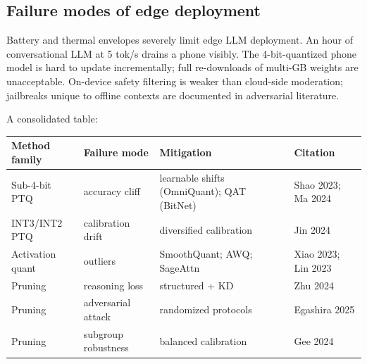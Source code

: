 \subsection{Failure modes of edge deployment}\label{failure-modes-of-edge-deployment}

Battery and thermal envelopes severely limit edge LLM deployment. An hour of conversational LLM at 5 tok/s drains a phone visibly. The 4-bit-quantized phone model is hard to update incrementally; full re-downloads of multi-GB weights are unacceptable. On-device safety filtering is weaker than cloud-side moderation; jailbreaks unique to offline contexts are documented in adversarial literature.

A consolidated table:

{\def\LTcaptype{none} %
\begin{longtable}[]{@{}
  >{\raggedright\arraybackslash}p{}
  >{\raggedright\arraybackslash}p{}
  >{\raggedright\arraybackslash}p{}
  >{\raggedright\arraybackslash}p{}@{}}
\toprule\noalign{}
\begin{minipage}[b]{\linewidth}\raggedright
Method family
\end{minipage} & \begin{minipage}[b]{\linewidth}\raggedright
Failure mode
\end{minipage} & \begin{minipage}[b]{\linewidth}\raggedright
Mitigation
\end{minipage} & \begin{minipage}[b]{\linewidth}\raggedright
Citation
\end{minipage} \\
\midrule\noalign{}
\endhead
\bottomrule\noalign{}
\endlastfoot
Sub-4-bit PTQ & accuracy cliff & learnable shifts (OmniQuant); QAT (BitNet) & Shao 2023; Ma 2024 \\
INT3/INT2 PTQ & calibration drift & diversified calibration & Jin 2024 \\
Activation quant & outliers & SmoothQuant; AWQ; SageAttn & Xiao 2023; Lin 2023 \\
Pruning & reasoning loss & structured + KD & Zhu 2024 \\
Pruning & adversarial attack & randomized protocols & Egashira 2025 \\
Pruning & subgroup robustness & balanced calibration & Gee 2024 \\

\end{longtable}}
